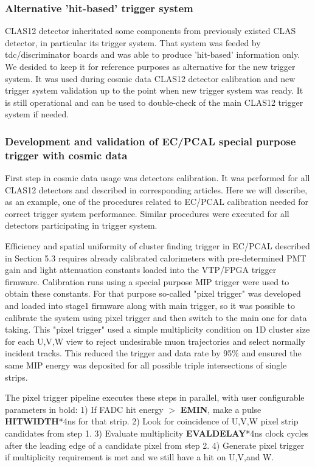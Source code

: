 \subsubsection{Alternative 'hit-based' trigger system}

CLAS12 detector inheritated some components from previously existed CLAS detector, in particular its trigger system. That system was feeded by tdc/discriminator boards and was able to produce 'hit-based' information only. We desided to keep it for reference purposes as alternative for the new trigger system. It was used during cosmic data CLAS12 detector calibration and new trigger system validation up to the point when new trigger system was ready. It is still operational and can be used to double-check of the main CLAS12 trigger system if needed.

\subsubsection{Development and validation of EC/PCAL special purpose trigger with cosmic data}

First step in cosmic data usage was detectors calibration. It was performed for all CLAS12 detectors and described in corresponding articles. Here we will describe, as an example, one of the procedures related to EC/PCAL calibration needed for correct trigger system performance. Similar procedures were executed for all detectors participating in trigger system.

Efficiency and spatial uniformity of cluster finding trigger in EC/PCAL described in Section 5.3 requires already calibrated calorimeters with pre-determined PMT gain and light attenuation constants loaded into the VTP/FPGA trigger firmware.  Calibration runs using a special purpose MIP trigger were used to obtain these constants. For that purpose so-called "pixel trigger" was developed and loaded into stage1 firmware along with main trigger, so it was possible to calibrate the system using pixel trigger and then switch to the main one for data taking. This "pixel trigger" used a simple multiplicity condition on 1D cluster size for each U,V,W view to reject undesirable muon trajectories and select normally incident tracks.  This reduced the trigger and data rate by 95$\%$ and ensured the same MIP energy was deposited for all possible triple intersections of single strips.

The pixel trigger pipeline executes these steps in parallel, with user configurable parameters in bold:
  1) If FADC hit energy $>$ \textbf{EMIN}, make a pulse \textbf{HITWIDTH}*4ns for that strip.
  2) Look for coincidence of U,V,W pixel strip candidates from step 1.
  3) Evaluate multiplicity \textbf{EVALDELAY}*4ns clock cycles after the leading edge of a candidate pixel from step 2.
  4) Generate pixel trigger if multiplicity requirement is met and we still have a hit on U,V,and W. 

